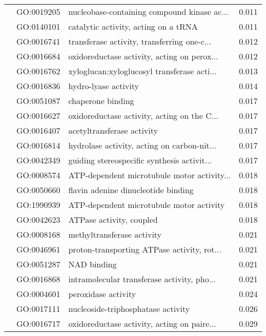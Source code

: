 \begin{longtable}{lllr}
   & GO:0019205 &  nucleobase-containing compound kinase ac... &         0.011 \\
   & GO:0140101 &         catalytic activity, acting on a tRNA &         0.011 \\
   & GO:0016741 &  transferase activity, transferring one-c... &         0.012 \\
   & GO:0016684 &  oxidoreductase activity, acting on perox... &         0.012 \\
   & GO:0016762 &  xyloglucan:xyloglucosyl transferase acti... &         0.013 \\
   & GO:0016836 &                         hydro-lyase activity &         0.014 \\
   & GO:0051087 &                            chaperone binding &         0.017 \\
   & GO:0016627 &  oxidoreductase activity, acting on the C... &         0.017 \\
   & GO:0016407 &                   acetyltransferase activity &         0.017 \\
   & GO:0016814 &  hydrolase activity, acting on carbon-nit... &         0.017 \\
   & GO:0042349 &  guiding stereospecific synthesis activit... &         0.017 \\
   & GO:0008574 &  ATP-dependent microtubule motor activity... &         0.018 \\
   & GO:0050660 &          flavin adenine dinucleotide binding &         0.018 \\
   & GO:1990939 &     ATP-dependent microtubule motor activity &         0.018 \\
   & GO:0042623 &                     ATPase activity, coupled &         0.018 \\
   & GO:0008168 &                   methyltransferase activity &         0.021 \\
   & GO:0046961 &  proton-transporting ATPase activity, rot... &         0.021 \\
   & GO:0051287 &                                  NAD binding &         0.021 \\
   & GO:0016868 &  intramolecular transferase activity, pho... &         0.021 \\
   & GO:0004601 &                          peroxidase activity &         0.024 \\
   & GO:0017111 &           nucleoside-triphosphatase activity &         0.026 \\
   & GO:0016717 &  oxidoreductase activity, acting on paire... &         0.029 \\

\end{longtable}
